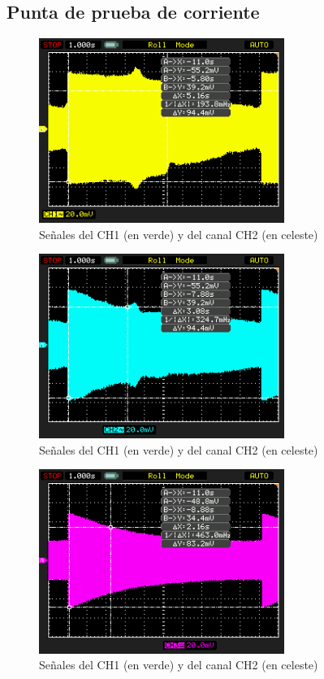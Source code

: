 \documentclass[a4paper,10pt]{article}
\begin{document}
		\subsection{Punta de prueba de corriente}
		\begin{figure}[!htb]
			\centering
			\includegraphics[width=8cm]{Imagenes/Mediciones instrumentos/NewFile5.png}
			\caption{Se\~nales del CH1 (en verde) y del canal CH2 (en celeste)} \label{img004}
		\end{figure}
		
		\begin{figure}[!htb]
			\centering
			\includegraphics[width=8cm]{Imagenes/Mediciones instrumentos/NewFile6.png}
			\caption{Se\~nales del CH1 (en verde) y del canal CH2 (en celeste)} \label{img005}
		\end{figure}				
		
		\begin{figure}[!htb]
			\centering
			\includegraphics[width=8cm]{Imagenes/Mediciones instrumentos/NewFile7.png}
			\caption{Se\~nales del CH1 (en verde) y del canal CH2 (en celeste)} \label{img006}
		\end{figure}		
	
\end{document}
